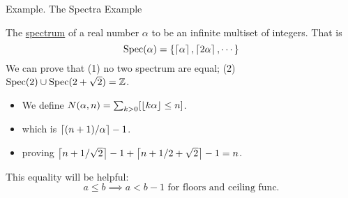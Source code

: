 \begin{frame}{Example. The Spectra Example}

\begin{example}
    The \underline{spectrum} of a real number $\alpha$ to be an 
    infinite multiset of integers. That is
    $$
    \text{Spec}(\alpha) = \{\left \lceil \alpha \right\rceil, \left \lceil 2\alpha \right\rceil, \cdots\}
    $$
    We can prove that (1) no two spectrum are equal; (2) $\text{Spec}(2)\cup \text{Spec}(2+\sqrt{2}) = \mathbb Z$. 
\end{example}

\pause 

\begin{itemize}
    \item We define $N(\alpha, n)=\sum _{k>0}[\left \lfloor k\alpha \right\rfloor\leq n]$.
    \item which is $\left \lceil (n+1)/\alpha \right\rceil-1$. 
    \item proving $\left \lceil n+1/\sqrt2 \right\rceil-1+\left \lceil n+1/2+\sqrt2 \right\rceil-1=n$. 

\end{itemize}

This equality will be helpful: 
$$
a\leq b \implies a<b-1 \text{ for floors and ceiling func.}
$$

\end{frame}




